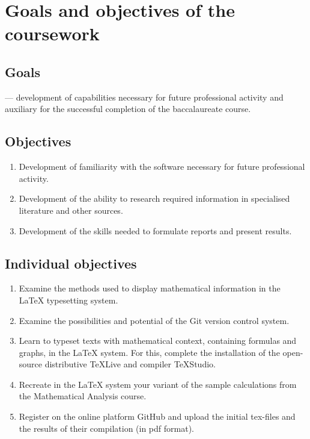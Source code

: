 \documentclass[12pt]{article}
\begin{document}


\newpage	
\tableofcontents

\newpage
\pagestyle{plain}
\section{Goals and objectives of the coursework}	
\subsection{Goals}
--- development of capabilities necessary for future professional activity and auxiliary for the successful completion of the baccalaureate course.

\subsection{Objectives}
\begin{enumerate}
\item Development of familiarity with the software necessary for future professional activity.
\item Development of the ability to research required information in specialised literature and other sources.
\item Development of the skills needed to formulate reports and present results.
\end{enumerate}

\subsection{Individual objectives}	
\begin{enumerate}
\item Examine the methods used to display mathematical information in the \LaTeX {} typesetting system.  
\item Examine the possibilities and potential of the Git version control system.
\item Learn to typeset texts with mathematical context, containing formulas and graphs, in the \LaTeX {} system. For this, complete the installation of the open-source distributive TeXLive and compiler TeXStudio.
\item Recreate in the \LaTeX {} system your variant of the sample calculations from the Mathematical Analysis course.
\item Register on the online platform GitHub and upload the initial tex-files and the results of their compilation (in pdf format).  
\end{enumerate} 
\end{document}

